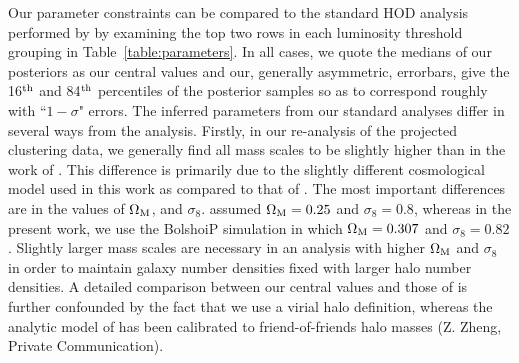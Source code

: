 \documentclass[usenatbib,usegraphicx,letterpaper]{mn2e}
\begin{document}
Our parameter constraints can be compared to the standard HOD analysis performed by \citet{zehavi_etal11} 
by examining the top two rows in each luminosity threshold grouping in Table~\ref{table:parameters}. In all 
cases, we quote the medians of our posteriors as our central values and our, 
generally asymmetric, errorbars, give the 16$^{\rm th}$ and 
84$^{\rm th}$ percentiles of the posterior samples so as to correspond roughly with ``$1-\sigma$" errors. 
The inferred parameters from our standard analyses differ in several ways from the \citet{zehavi_etal11}
analysis. Firstly, in our re-analysis of the projected clustering data, we generally find all mass scales to
be slightly higher than in the work of \citet{zehavi_etal11}. This difference is primarily due to the slightly
different cosmological model used in this work as compared to that of \citet{zehavi_etal11}.
The most important differences are in the values of $\Omega_{\rm M}$, and $\sigma_8$.
\citet{zehavi_etal11} assumed $\Omega_{\rm M}=0.25$ and $\sigma_8=0.8$,
whereas in the present work, we use the BolshoiP simulation in which $\Omega_{\rm M}=0.307$ and $\sigma_8=0.82$.
Slightly larger mass scales are necessary in an analysis with higher $\Omega_{\rm M}$ and $\sigma_8$ in order
to maintain galaxy number densities fixed with larger halo number densities. A detailed comparison between our central 
values and those of \citet{zehavi_etal11} is further confounded by the fact that we use a virial halo definition, 
whereas the analytic model of \citet{zehavi_etal11} 
has been calibrated to friend-of-friends halo masses (Z. Zheng, Private Communication). 
\end{document}
